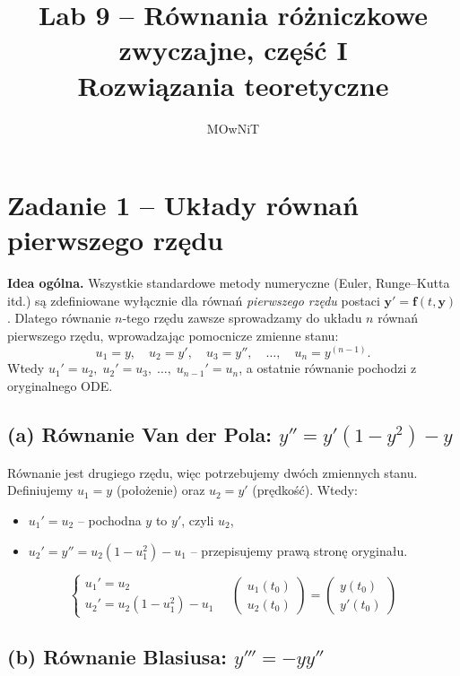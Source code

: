 \documentclass[a4paper,12pt]{article}
\title{Lab 9 -- Równania różniczkowe zwyczajne, część I\\Rozwiązania teoretyczne}
\author{MOwNiT}
\date{}
\begin{document}
\maketitle

\section*{Zadanie 1 -- Układy równań pierwszego rzędu}

\begin{komentarz}
\textbf{Idea ogólna.}
Wszystkie standardowe metody numeryczne (Euler, Runge--Kutta itd.) są zdefiniowane
wyłącznie dla równań \emph{pierwszego rzędu} postaci $\mathbf{y}' = \mathbf{f}(t,\mathbf{y})$.
Dlatego równanie $n$-tego rzędu zawsze sprowadzamy do układu $n$ równań pierwszego rzędu,
wprowadzając pomocnicze zmienne stanu:
\[
  u_1 = y,\quad u_2 = y',\quad u_3 = y'',\quad \ldots,\quad u_n = y^{(n-1)}.
\]
Wtedy $u_1' = u_2,\; u_2' = u_3,\; \ldots,\; u_{n-1}' = u_n$,
a ostatnie równanie pochodzi z oryginalnego ODE.
\end{komentarz}

\subsection*{(a) Równanie Van der Pola: $y'' = y'(1-y^2) - y$}

Równanie jest drugiego rzędu, więc potrzebujemy dwóch zmiennych stanu.
Definiujemy $u_1 = y$ (położenie) oraz $u_2 = y'$ (prędkość). Wtedy:
\begin{itemize}
  \item $u_1' = u_2$ \quad -- pochodna $y$ to $y'$, czyli $u_2$,
  \item $u_2' = y'' = u_2(1 - u_1^2) - u_1$ \quad -- przepisujemy prawą stronę oryginału.
\end{itemize}
\[
\boxed{
\begin{cases}
u_1' = u_2 \\
u_2' = u_2(1 - u_1^2) - u_1
\end{cases}
}
\quad
\begin{pmatrix} u_1(t_0) \\ u_2(t_0) \end{pmatrix}
=
\begin{pmatrix} y(t_0) \\ y'(t_0) \end{pmatrix}
\]

\subsection*{(b) Równanie Blasiusa: $y''' = -yy''$}
\end{document}
